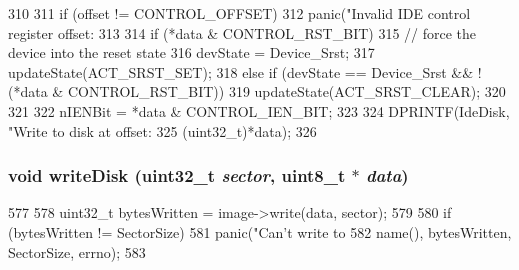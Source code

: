 \begin{DoxyCode}
310 {
311     if (offset != CONTROL_OFFSET)
312         panic("Invalid IDE control register offset: %
313 
314     if (*data & CONTROL_RST_BIT) {
315         // force the device into the reset state
316         devState = Device_Srst;
317         updateState(ACT_SRST_SET);
318     } else if (devState == Device_Srst && !(*data & CONTROL_RST_BIT)) {
319         updateState(ACT_SRST_CLEAR);
320     }
321 
322     nIENBit = *data & CONTROL_IEN_BIT;
323 
324     DPRINTF(IdeDisk, "Write to disk at offset: %
325             (uint32_t)*data);
326 }
\end{DoxyCode}
\hypertarget{classIdeDisk_aaf5688ef23ac188d55decc9021229d43}{
\subsubsection[{writeDisk}]{\setlength{\rightskip}{0pt plus 5cm}void writeDisk ({\bf uint32\_\-t} {\em sector}, \/  uint8\_\-t $\ast$ {\em data})}}
\label{classIdeDisk_aaf5688ef23ac188d55decc9021229d43}



\begin{DoxyCode}
577 {
578     uint32_t bytesWritten = image->write(data, sector);
579 
580     if (bytesWritten != SectorSize)
581         panic("Can't write to %
582               name(), bytesWritten, SectorSize, errno);
583 }
\end{DoxyCode}


